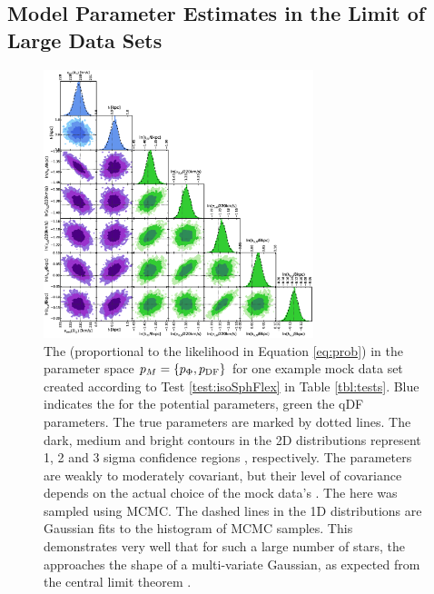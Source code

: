 \subsection{Model Parameter Estimates in the Limit of Large Data Sets} \label{sec:largedata}



\begin{figure}[!htbp]
\centering
\includegraphics[width=0.7\textwidth]{figs/isoSphFlex_short_hot_2kpc_triangle_MCMC.eps}
\caption{The \pdf{} (proportional to the likelihood in Equation \ref{eq:prob}) in the parameter space $p_M{} = \{p_\Phi,p_\text{DF}\}$ for one example mock data set created according to Test \ref{test:isoSphFlex} in Table \ref{tbl:tests}. Blue indicates the \pdf{} for the potential parameters, green the qDF parameters. The true parameters are marked by dotted lines. The dark, medium and bright contours in the 2D distributions represent 1, 2 and 3 sigma confidence regions , respectively. The parameters are weakly to moderately covariant, but their level of covariance depends on the actual choice of the mock data's \pmodel{}. The \pdf{} here was sampled using MCMC. The dashed lines in the 1D distributions are Gaussian fits to the histogram of MCMC samples. This demonstrates very well that for such a large number of stars, the \pdf{} approaches the shape of a multi-variate Gaussian, as expected from the central limit theorem .}
\label{fig:isoSphFlex_triangleplot}
\end{figure}

